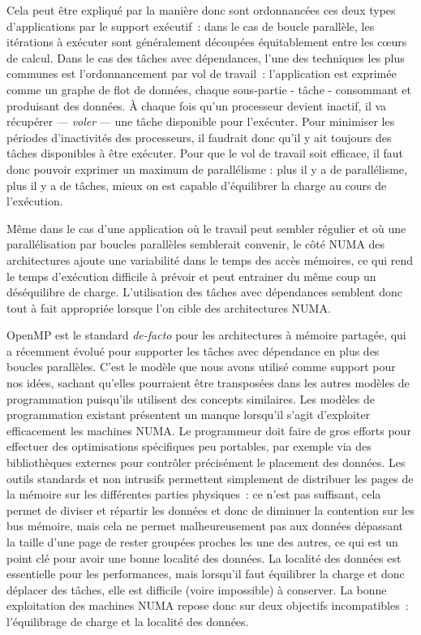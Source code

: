 Cela peut être expliqué par la manière donc sont ordonnancées ces deux types d'applications par le support exécutif~: dans le cas de boucle parallèle, les itérations à exécuter sont généralement découpées équitablement entre les cœurs de calcul.
Dans le cas des tâches avec dépendances, l'une des techniques les plus communes est l'ordonnancement par vol de travail~: l'application est exprimée comme un graphe de flot de données, chaque sous-partie - tâche - consommant et produisant des données. 
À chaque fois qu'un processeur devient inactif, il va récupérer --- \emph{voler} --- une tâche disponible pour l'exécuter.
Pour minimiser les périodes d'inactivités des processeurs, il faudrait donc qu'il y ait toujours des tâches disponibles à être exécuter.
Pour que le vol de travail soit efficace, il faut donc pouvoir exprimer un maximum de parallélisme : plus il y a de parallélisme, plus il y a de tâches, mieux on est capable d'équilibrer la charge au cours de l'exécution.

Même dans le cas d'une application où le travail peut sembler régulier et où une parallélisation par boucles parallèles semblerait convenir, le côté NUMA des architectures ajoute une variabilité dans le temps des accès mémoires, ce qui rend le temps d'exécution difficile à prévoir et peut entrainer du même coup un déséquilibre de charge.
L'utilisation des tâches avec dépendances semblent donc tout à fait appropriée lorsque l'on cible des architectures NUMA.

OpenMP est le standard \emph{de-facto} pour les architectures à mémoire partagée, qui a récemment évolué pour supporter les tâches avec dépendance en plus des boucles parallèles.
C'est le modèle que nous avons utilisé comme support pour nos idées, sachant qu'elles pourraient être transposées dans les autres modèles de programmation puisqu'ils utilisent des concepts similaires.
Les modèles de programmation existant présentent un manque lorsqu'il s'agit d'exploiter efficacement les machines NUMA.
Le programmeur doit faire de gros efforts pour effectuer des optimisations spécifiques peu portables, par exemple via des bibliothèques externes pour contrôler précisément le placement des données.
Les outils standards et non intrusifs permettent simplement de distribuer les pages de la mémoire sur les différentes parties physiques~: ce n'est pas suffisant, cela permet de diviser et répartir les données et donc de diminuer la contention sur les bus mémoire, mais cela ne permet malheureusement pas aux données dépassant la taille d'une page de rester groupées proches les une des autres, ce qui est un point clé pour avoir une bonne localité des données.
La localité des données est essentielle pour les performances, mais lorsqu'il faut équilibrer la charge et donc déplacer des tâches, elle est difficile (voire impossible) à conserver.
La bonne exploitation des machines NUMA repose donc sur deux objectifs incompatibles~: l'équilibrage de charge et la localité des données.

